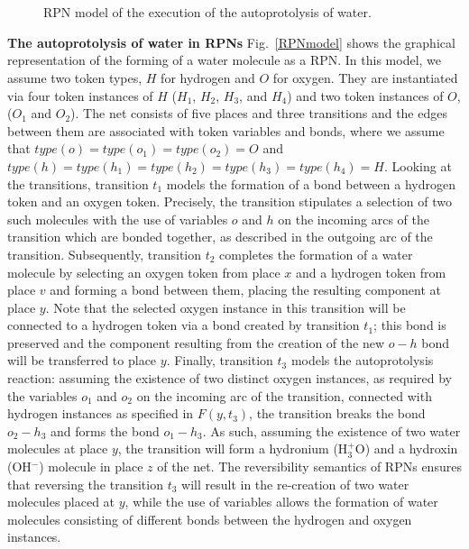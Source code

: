 \documentclass[runningheads]{llncs}
\newcommand{\type}{\mathit{type}}
\begin{document}
\begin{figure}
        \centering
        \\\vspace{-0.25cm}
        \\\vspace{-0.25cm}
        \caption{RPN model of the execution of the autoprotolysis of water.}
        \label{execution}
\end{figure}


\noindent
\textbf{The autoprotolysis of water in RPNs } Fig.~\ref{RPNmodel} shows the graphical representation of the forming of a water molecule as a RPN.
In this model, we assume two token types, $H$ for hydrogen
and $O$ for oxygen. They are instantiated via four token instances of $H$ ($H_1$, $H_2$, $H_3$, and $H_4$) and two token instances of
$O$, ($O_1$ and $O_2$). The net consists of five places and three transitions and the edges between
them are associated with token variables and bonds, where we assume that $\type(o)=\type(o_1)=\type(o_2) = O$
and $\type(h)=\type(h_1)=\type(h_2)=\type(h_3)=\type(h_4)=H$. 
Looking at the transitions, transition $t_1$ models the formation of a bond between a hydrogen
token and an oxygen token. Precisely, the transition stipulates a selection of two such
molecules with the use
of variables $o$ and $h$ on the incoming arcs of the transition which are bonded
together, as described in the outgoing arc of the transition.
Subsequently, transition $t_2$ completes
the formation of a water molecule by selecting an oxygen token from place $x$ and
a hydrogen token from place $v$ and forming a bond between them, placing the resulting component at place $y$. Note that the selected oxygen instance in this transition will be connected to a hydrogen token via a bond 
created by transition $t_1$; this bond is preserved and the component resulting from the creation of
the new $o-h$ bond will be transferred to place $y$.
Finally, transition $t_3$ models the autoprotolysis reaction: assuming the existence of two distinct oxygen
instances, as required by the variables $o_1$ and $o_2$ on the incoming arc of the transition, connected
with hydrogen instances as specified in $F(y,t_3)$, the transition breaks the bond $o_2-h_3$ and forms the
bond  $o_1-h_3$.  As such, assuming the existence of two water molecules at place $y$, the transition
will form  a hydronium  (H$_3^+$O) and a hydroxin (OH$^-$) molecule in place $z$ of the net.
The reversibility semantics of RPNs ensures that  reversing the transition $t_3$ will result in the re-creation
of  two water molecules placed at $y$, while the use of variables allows the formation of water molecules consisting
of different bonds between the hydrogen and oxygen instances. 
\end{document}
